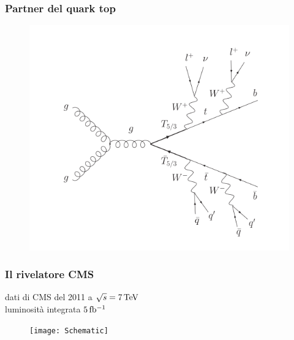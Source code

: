\documentclass[italian]{beamer}
\begin{document}
\begin{frame}
    \frametitle{Partner del quark top}
    \begin{figure}[h]
        \centering
        \includegraphics[height=.8\textheight]{TTbar_feynman}
    \end{figure}
\end{frame}

\begin{frame}
    \frametitle{Il rivelatore CMS}
    dati di CMS del
            2011 a $\sqrt{s} = \unit[7]{TeV}$\\
            luminosit\`a integrata
            $\unit[5]{fb^{-1}}$                          
            \begin{figure}[h]
                \centering
                \texttt{[image: Schematic]}
            \end{figure}
\end{frame}
\end{document}
